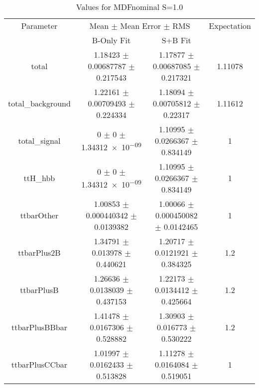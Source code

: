 \begin{table}
\centering
\caption{Values for MDFnominal S=1.0}
\begin{tabular}{cccc}
\toprule
Parameter & \multicolumn{2}{c}{Mean $\pm$ Mean Error $\pm$ RMS} & Expectation\\
 & B-Only Fit & S+B Fit & \\
\midrule
total & \num{1.18423} $\pm$ \num{0.00687787} $\pm$ \num{0.217543} & \num{1.17877} $\pm$ \num{0.00687085} $\pm$ \num{0.217321} & \num{1.11078}\\
total\_background & \num{1.22161} $\pm$ \num{0.00709493} $\pm$ \num{0.224334} & \num{1.18094} $\pm$ \num{0.00705812} $\pm$ \num{0.22317} & \num{1.11612}\\
total\_signal & \num{0} $\pm$ \num{0} $\pm$ \num{1.34312e-09} & \num{1.10995} $\pm$ \num{0.0266367} $\pm$ \num{0.834149} & \num{1}\\
ttH\_hbb & \num{0} $\pm$ \num{0} $\pm$ \num{1.34312e-09} & \num{1.10995} $\pm$ \num{0.0266367} $\pm$ \num{0.834149} & \num{1}\\
ttbarOther & \num{1.00853} $\pm$ \num{0.000440342} $\pm$ \num{0.0139382} & \num{1.00066} $\pm$ \num{0.000450082} $\pm$ \num{0.0142465} & \num{1}\\
ttbarPlus2B & \num{1.34791} $\pm$ \num{0.013978} $\pm$ \num{0.440621} & \num{1.20717} $\pm$ \num{0.0121921} $\pm$ \num{0.384325} & \num{1.2}\\
ttbarPlusB & \num{1.26636} $\pm$ \num{0.0138039} $\pm$ \num{0.437153} & \num{1.22173} $\pm$ \num{0.0134412} $\pm$ \num{0.425664} & \num{1.2}\\
ttbarPlusBBbar & \num{1.41478} $\pm$ \num{0.0167306} $\pm$ \num{0.528882} & \num{1.30903} $\pm$ \num{0.016773} $\pm$ \num{0.530222} & \num{1.2}\\
ttbarPlusCCbar & \num{1.01997} $\pm$ \num{0.0162433} $\pm$ \num{0.513828} & \num{1.11278} $\pm$ \num{0.0164084} $\pm$ \num{0.519051} & \num{1}\\
\bottomrule
\end{tabular}
\end{table}